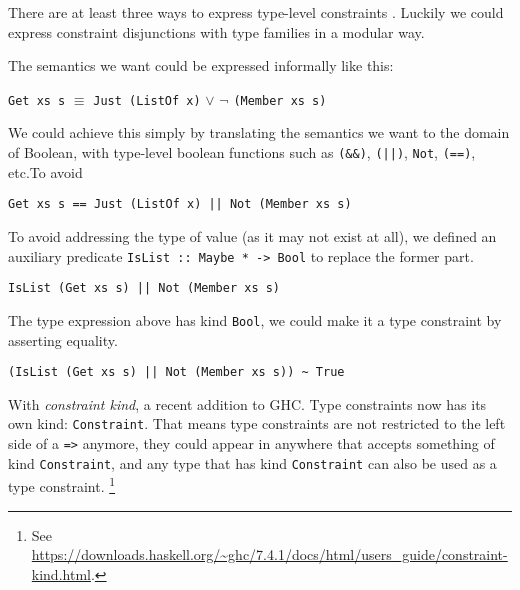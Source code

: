 \documentclass[pldi]{sigplanconf-pldi16}
\begin{document}
There are at least three ways to express type-level constraints
\cite{singletons}. Luckily we could express constraint disjunctions with type
 families in a modular way.

The semantics we want could be expressed informally like this:

\texttt{Get xs s} $\equiv$ \texttt{Just (ListOf x)}
$\vee$ $\neg$ \texttt{(Member xs s)}

We could achieve this simply by translating the semantics we want to the
 domain of Boolean, with type-level boolean functions such as
\texttt{(&&)},
\texttt{(||)}, \texttt{Not},
\texttt{(==)}, etc.\footnotemark To avoid


\begin{verbatim}
Get xs s == Just (ListOf x) || Not (Member xs s)
\end{verbatim}

To avoid addressing the type of value (as it may not exist at all), we defined
 an auxiliary predicate \texttt{IsList :: Maybe * -> Bool} to
 replace the former part.

\begin{verbatim}
IsList (Get xs s) || Not (Member xs s)
\end{verbatim}

The type expression above has kind \texttt{Bool}, we could make it
 a type constraint by asserting equality.

\begin{verbatim}
(IsList (Get xs s) || Not (Member xs s)) ~ True
\end{verbatim}

With \emph{constraint kind}, a recent addition to GHC. Type constraints now has
 its own kind: \texttt{Constraint}. That means type constraints
 are not restricted to the left side of a \texttt{=>} anymore,
 they could appear in anywhere that accepts something of kind
 \texttt{Constraint}, and any type that has kind
 \texttt{Constraint} can also be used as a type constraint.
 \footnote{See \url{https://downloads.haskell.org/~ghc/7.4.1/docs/html/users_guide/constraint-kind.html}.}
\end{document}
